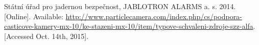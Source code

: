 

\raggedright
\sloppy

\begin{thebibliography}{99}

 	Státní úřad pro jadernou bezpečnost, JABLOTRON ALARMS a. s. 2014. [Online]. Available: \url{http://www.particlecamera.com/index.php/cs/podpora-casticove-kamery-mx-10/ke-stazeni-mx-10/item/typove-schvaleni-zdroje-szz-alfa}. [Accessed Oct. 14th, 2015].

\end{thebibliography}
